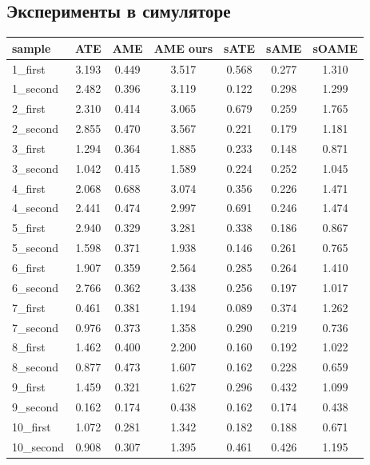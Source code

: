 \documentclass{mipt-thesis-ms}
\begin{document}
	\subsection{Эксперименты в симуляторе}
	\label{section_experiments}
	
	\begin{table}
		\centering
		\begin{tabular}{|l|c|c|c|c|c|c|}
			\textbf{sample} & \textbf{ATE} & \textbf{AME} & \textbf{AME ours} & \textbf{sATE} & \textbf{sAME} & \textbf{sOAME} \\
			\hline
			1\_first & 3.193 & 0.449 & 3.517 & 0.568 & 0.277 & 1.310 \\
			1\_second & 2.482 & 0.396 & 3.119 & 0.122 & 0.298 & 1.299 \\
			2\_first & 2.310 & 0.414 & 3.065 & 0.679 & 0.259 & 1.765 \\
			2\_second & 2.855 & 0.470 & 3.567 & 0.221 & 0.179 & 1.181 \\
			3\_first & 1.294 & 0.364 & 1.885 & 0.233 & 0.148 & 0.871 \\
			3\_second & 1.042 & 0.415 & 1.589 & 0.224 & 0.252 & 1.045 \\
			4\_first & 2.068 & 0.688 & 3.074 & 0.356 & 0.226 & 1.471 \\
			4\_second & 2.441 & 0.474 & 2.997 & 0.691 & 0.246 & 1.474 \\
			5\_first & 2.940 & 0.329 & 3.281 & 0.338 & 0.186 & 0.867 \\
			5\_second & 1.598 & 0.371 & 1.938 & 0.146 & 0.261 & 0.765 \\
			6\_first & 1.907 & 0.359 & 2.564 & 0.285 & 0.264 & 1.410 \\
			6\_second & 2.766 & 0.362 & 3.438 & 0.256 & 0.197 & 1.017 \\
			7\_first & 0.461 & 0.381 & 1.194 & 0.089 & 0.374 & 1.262 \\
			7\_second & 0.976 & 0.373 & 1.358 & 0.290 & 0.219 & 0.736 \\
			8\_first & 1.462 & 0.400 & 2.200 & 0.160 & 0.192 & 1.022 \\
			8\_second & 0.877 & 0.473 & 1.607 & 0.162 & 0.228 & 0.659 \\
			9\_first & 1.459 & 0.321 & 1.627 & 0.296 & 0.432 & 1.099 \\
			9\_second & 0.162 & 0.174 & 0.438 & 0.162 & 0.174 & 0.438 \\
			10\_first & 1.072 & 0.281 & 1.342 & 0.182 & 0.188 & 0.671 \\
			10\_second & 0.908 & 0.307 & 1.395 & 0.461 & 0.426 & 1.195 \\

\end{tabular}
\end{table}
\end{document}
